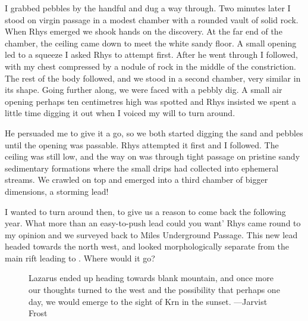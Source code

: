 I grabbed pebbles by the handful and dug a way through. Two minutes later I stood on virgin passage in a modest chamber with a rounded vault of solid rock. When Rhys emerged we shook hands on the discovery. At the far end of the chamber, the ceiling came down to meet the white sandy floor. A small opening led to a squeeze I asked Rhys to attempt first. After he went through I followed, with my chest compressed by a nodule of rock in the middle of the constriction. The rest of the body followed, and we stood in a second chamber, very similar in its shape. Going further along, we were faced with a pebbly dig. A small air opening perhaps ten centimetres high was spotted and Rhys insisted we spent a little time digging it out when I voiced my will to turn around. 

He persuaded me to give it a go, so we both started digging the sand and pebbles until the opening was passable. Rhys attempted it first and I followed. The ceiling was still low, and the way on was through tight passage on pristine sandy sedimentary formations where the small drips had collected into ephemeral streams. We crawled on top and emerged into a third chamber of bigger dimensions, a storming lead! 

I wanted to turn around then, to give us a reason to come back the following year. What more than an easy-to-push lead could you want' Rhys came round to my opinion and we surveyed back to Miles Underground Passage. This new lead headed towards the north west, and looked morphologically separate from the main rift leading to . Where would it go?


\begin{figure*}[b!]
\checkoddpage \ifoddpage \forcerectofloat \else \forceversofloat \fi
\centering
 \caption{Lazarus ended up heading towards blank mountain, and once more our thoughts turned to the west and the possibility that perhaps one day, we would emerge to the sight of Krn in the sunset. ---Jarvist Frost}
 \label{jarv sunset}
\end{figure*}


